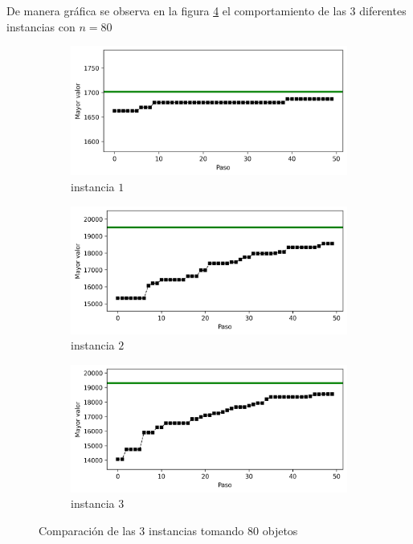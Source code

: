 \documentclass{article}
\begin{document}
De manera gr\'afica se observa en la figura \ref{f2} el comportamiento de las 3 diferentes instancias con $n=80$ 

\begin{figure}[H]
       \centering
       \begin{subfigure}[b]{0.8\linewidth}
           \includegraphics[width=\linewidth]{80i1.png}
           \caption{instancia $1$}
           \label{fig:westminster_lateral}
        \end{subfigure}
        \begin{subfigure}[b]{0.8\linewidth}
            \includegraphics[width=\linewidth]{8012.png}
            \caption{instancia $2$}
            \label{fig:westminster_aerea}
        \end{subfigure}
        \begin{subfigure}[b]{0.8\linewidth}
           \includegraphics[width=\linewidth]{80i3.png}
           \caption{instancia $3$}
           \label{fig:westminster_aerea}
        \end{subfigure}
        \caption{Comparaci\'on de las $3$ instancias tomando $80$ objetos}
        \label{f2}
\end{figure}
\end{document}

